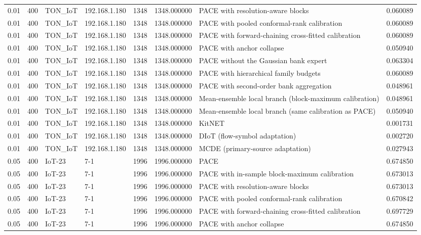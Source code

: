 \begin{tabular}{llllllll}
0.01 & 400 & TON\_IoT & 192.168.1.180 & 1348 & 1348.000000 & PACE with resolution-aware blocks & 0.060089 \\
0.01 & 400 & TON\_IoT & 192.168.1.180 & 1348 & 1348.000000 & PACE with pooled conformal-rank calibration & 0.060089 \\
0.01 & 400 & TON\_IoT & 192.168.1.180 & 1348 & 1348.000000 & PACE with forward-chaining cross-fitted calibration & 0.060089 \\
0.01 & 400 & TON\_IoT & 192.168.1.180 & 1348 & 1348.000000 & PACE with anchor collapse & 0.050940 \\
0.01 & 400 & TON\_IoT & 192.168.1.180 & 1348 & 1348.000000 & PACE without the Gaussian bank expert & 0.063304 \\
0.01 & 400 & TON\_IoT & 192.168.1.180 & 1348 & 1348.000000 & PACE with hierarchical family budgets & 0.060089 \\
0.01 & 400 & TON\_IoT & 192.168.1.180 & 1348 & 1348.000000 & PACE with second-order bank aggregation & 0.048961 \\
0.01 & 400 & TON\_IoT & 192.168.1.180 & 1348 & 1348.000000 & Mean-ensemble local branch (block-maximum calibration) & 0.048961 \\
0.01 & 400 & TON\_IoT & 192.168.1.180 & 1348 & 1348.000000 & Mean-ensemble local branch (same calibration as PACE) & 0.050940 \\
0.01 & 400 & TON\_IoT & 192.168.1.180 & 1348 & 1348.000000 & KitNET & 0.001731 \\
0.01 & 400 & TON\_IoT & 192.168.1.180 & 1348 & 1348.000000 & DIoT (flow-symbol adaptation) & 0.002720 \\
0.01 & 400 & TON\_IoT & 192.168.1.180 & 1348 & 1348.000000 & MCDE (primary-source adaptation) & 0.027943 \\
0.05 & 400 & IoT-23 & 7-1 & 1996 & 1996.000000 & PACE & 0.674850 \\
0.05 & 400 & IoT-23 & 7-1 & 1996 & 1996.000000 & PACE with in-sample block-maximum calibration & 0.673013 \\
0.05 & 400 & IoT-23 & 7-1 & 1996 & 1996.000000 & PACE with resolution-aware blocks & 0.673013 \\
0.05 & 400 & IoT-23 & 7-1 & 1996 & 1996.000000 & PACE with pooled conformal-rank calibration & 0.670842 \\
0.05 & 400 & IoT-23 & 7-1 & 1996 & 1996.000000 & PACE with forward-chaining cross-fitted calibration & 0.697729 \\
0.05 & 400 & IoT-23 & 7-1 & 1996 & 1996.000000 & PACE with anchor collapse & 0.674850 \\

\end{tabular}
